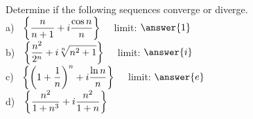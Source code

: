 \documentclass[handout]{ximera}
\begin{document}
\begin{problem}
Determine if the following sequences converge or diverge.\\
a) $\displaystyle \;\; \left\{\frac{n}{n+1}+ i\frac{\cos n}{n} \right\} \quad$  \quad limit: $\answer{1}$\\
b) $\displaystyle\;\;  \left\{\frac{n^2}{2^n}+ i\sqrt[n]{n^2 +1} \right\} \quad$  \quad limit: $\answer{i}$\\
c) $\displaystyle\;\; \left\{\left(1+\frac{1}{n}\right)^n+ i\frac{\ln n}{n} \right\} \quad$  \quad limit: $\answer{e}$\\
d) $\displaystyle\;\; \left\{\frac{n^2}{1+n^3}+i\frac{n^2}{1+n} \right\} \quad$  

\end{problem}
\end{document}
